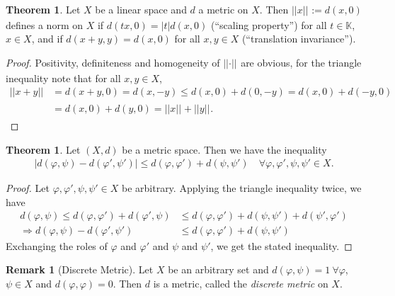 \documentclass[12pt, a4paper]{article}
\numberwithin{equation}{section}
\theoremstyle{definition}
\theoremstyle{definition}
\newtheorem{remark}[thm]{Remark} %
\newtheorem{theorem}[thm]{Theorem}
\newcommand{\norm}[2]{\left\vert\left\vert #1 \right\vert\right\vert_{#2}}
\newcommand{\abs}[1]{\left\vert #1 \right\vert}
\begin{document}
	\begin{theorem}
		Let $X$ be a linear space and $d$ a metric on $X$. Then $\norm{x}{} := d(x, 0)$ defines a norm on $X$ if $d(tx, 0) = \abs{t}d(x, 0)$ (\enquote{scaling property}) for all $t\in\mathbb K$, $x\in X$, and if $d(x + y, y) = d(x, 0)$ for all $x, y\in X$ (\enquote{translation invariance}).
	\end{theorem}

	\begin{proof}
		Positivity, definiteness and homogeneity of $\norm{\cdot}{}$ are obvious, for the triangle inequality note that for all $x, y\in X$,
		\begin{align*}
			\norm{x + y}{} &= d(x + y, 0) = d(x, -y) \leq d(x, 0) + d(0, -y) = d(x, 0) + d(-y, 0) 
			\\ &= d(x, 0) + d(y, 0) = \norm{x}{} + \norm{y}{}.
		\end{align*}
	\end{proof}
	
	\begin{theorem}\label{thrm:vierecksungleichung}
		Let $(X, d)$ be a metric space. Then we have the inequality
		\begin{align}
			\abs{d(\varphi, \psi) - d(\varphi', \psi')} \leq d(\varphi, \varphi') + d(\psi, \psi') \quad \forall \varphi, \varphi', \psi, \psi'\in X.
		\end{align}
	\end{theorem}

	\begin{proof}
		Let $\varphi, \varphi', \psi, \psi'\in X$ be arbitrary. Applying the triangle inequality twice, we have
		\begin{align}
			d(\varphi, \psi) \leq d(\varphi, \varphi') + d(\varphi', \psi) &\leq d(\varphi, \varphi') + d(\psi, \psi') + d(\psi', \varphi')
			\\ \Rightarrow d(\varphi, \psi) - d(\varphi', \psi') &\leq d(\varphi, \varphi') + d(\psi, \psi')
		\end{align}
		Exchanging the roles of $\varphi$ and $\varphi'$ and $\psi$ and $\psi'$, we get the stated inequality.
	\end{proof}
	
	\begin{remark}[Discrete Metric]\label{remark:discrete-metric}
		Let $X$ be an arbitrary set and $d(\varphi, \psi) = 1 \ \forall \varphi$, $\psi\in X$ and $d(\varphi, \varphi) = 0$. Then $d$ is a metric, called the \textit{discrete metric} on $X$. 
	\end{remark}
	
\end{document}
